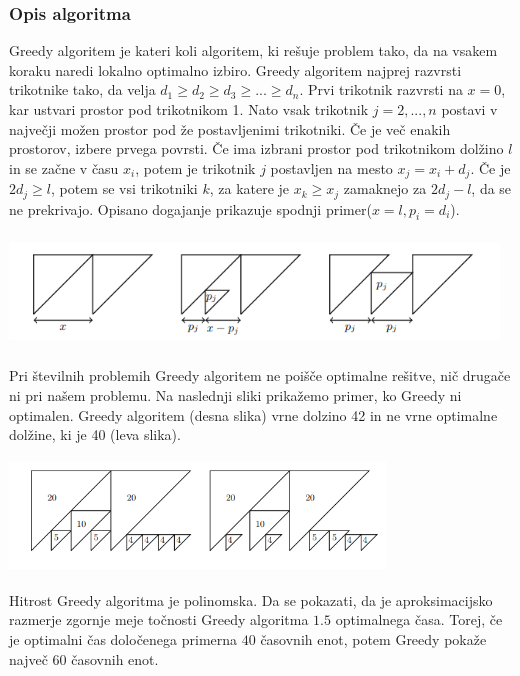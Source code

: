 \documentclass[a4paper,12pt]{article}
\theoremstyle{definition}
\theoremstyle{plain}
\begin{document}
\subsubsection{Opis algoritma}
Greedy algoritem je kateri koli algoritem, ki rešuje problem tako, da na vsakem koraku naredi lokalno optimalno izbiro.
Greedy algoritem najprej razvrsti trikotnike tako, da velja \newline
$d_1 \geq d_2 \geq d_3 \geq ... \geq d_n$. Prvi trikotnik razvrsti na $x=0$, kar ustvari prostor pod trikotnikom 1.
Nato vsak trikotnik $j=2,...,n$ postavi v največji možen prostor pod že postavljenimi trikotniki. Če je več enakih prostorov, izbere prvega povrsti.
Če ima izbrani prostor pod trikotnikom dolžino $l$ in se začne v času $x_i$, potem je trikotnik $j$ postavljen na mesto $x_j=x_i+d_j$. Če je $2d_j \ge l$,  potem se vsi trikotniki $k$, za katere je $x_k \ge x_j$ zamaknejo za $ 2d_j-l$, da se ne prekrivajo. Opisano 
dogajanje prikazuje spodnji primer($x=l, p_i = d_i $).
\begin{center}
    \includegraphics[width=13cm, height=3cm]{greedy.png} 
 \end{center}
Pri številnih problemih Greedy algoritem ne poišče optimalne rešitve, nič drugače ni pri našem problemu.
Na naslednji sliki prikažemo primer, ko Greedy ni optimalen. Greedy algoritem (desna slika) vrne dolzino 42 in ne vrne optimalne dolžine, ki je 40 (leva slika).
\begin{center}
    \includegraphics[width=10cm, height=3cm]{primer_neoptimalnosti_greedy.png} 
 \end{center}
Hitrost Greedy algoritma je polinomska. Da se pokazati, da je aproksimacijsko razmerje zgornje meje točnosti Greedy algoritma $1.5$ optimalnega časa. Torej, če je optimalni čas določenega primerna
$40$ časovnih enot, potem Greedy pokaže največ $60$ časovnih enot.
\end{document}
